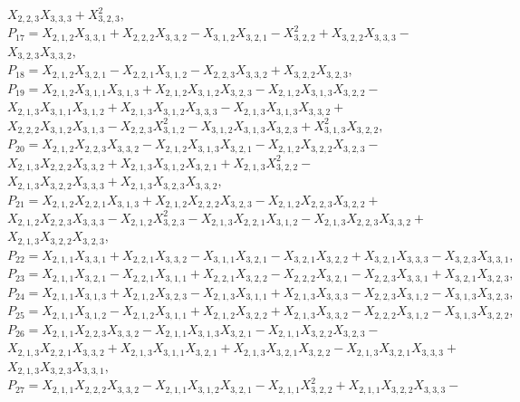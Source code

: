 \documentclass[10pt]{beamer}
\begin{document}
$X_{2,2,3}X_{3,3,3}+X_{3,2,3}^2,$\\
$P_{17}=X_{2,1,2}X_{3,3,1}+X_{2,2,2}X_{3,3,2}-X_{3,1,2}X_{3,2,1}-X_{3,2,2}^2+X_{3,2,2}X_{3,3,3}-$\\
$X_{3,2,3}X_{3,3,2},$\\
$P_{18}=X_{2,1,2}X_{3,2,1}-X_{2,2,1}X_{3,1,2}-X_{2,2,3}X_{3,3,2}+X_{3,2,2}X_{3,2,3},$\\
$P_{19}=X_{2,1,2}X_{3,1,1}X_{3,1,3}+X_{2,1,2}X_{3,1,2}X_{3,2,3}-X_{2,1,2}X_{3,1,3}X_{3,2,2}-$\\
$X_{2,1,3}X_{3,1,1}X_{3,1,2}+X_{2,1,3}X_{3,1,2}X_{3,3,3}-X_{2,1,3}X_{3,1,3}X_{3,3,2}+$\\
$X_{2,2,2}X_{3,1,2}X_{3,1,3}-X_{2,2,3}X_{3,1,2}^2-X_{3,1,2}X_{3,1,3}X_{3,2,3}+X_{3,1,3}^2X_{3,2,2},$\\
$P_{20}=X_{2,1,2}X_{2,2,3}X_{3,3,2}-X_{2,1,2}X_{3,1,3}X_{3,2,1}-X_{2,1,2}X_{3,2,2}X_{3,2,3}-$\\
$X_{2,1,3}X_{2,2,2}X_{3,3,2}+X_{2,1,3}X_{3,1,2}X_{3,2,1}+X_{2,1,3}X_{3,2,2}^2-$\\
$X_{2,1,3}X_{3,2,2}X_{3,3,3}+X_{2,1,3}X_{3,2,3}X_{3,3,2},$\\
$P_{21}=X_{2,1,2}X_{2,2,1}X_{3,1,3}+X_{2,1,2}X_{2,2,2}X_{3,2,3}-X_{2,1,2}X_{2,2,3}X_{3,2,2}+$\\
$X_{2,1,2}X_{2,2,3}X_{3,3,3}-X_{2,1,2}X_{3,2,3}^2-X_{2,1,3}X_{2,2,1}X_{3,1,2}-X_{2,1,3}X_{2,2,3}X_{3,3,2}+$\\
$X_{2,1,3}X_{3,2,2}X_{3,2,3},$\\
$P_{22}=X_{2,1,1}X_{3,3,1}+X_{2,2,1}X_{3,3,2}-X_{3,1,1}X_{3,2,1}-X_{3,2,1}X_{3,2,2}+X_{3,2,1}X_{3,3,3}-X_{3,2,3}X_{3,3,1},$\\
$P_{23}=X_{2,1,1}X_{3,2,1}-X_{2,2,1}X_{3,1,1}+X_{2,2,1}X_{3,2,2}-X_{2,2,2}X_{3,2,1}-X_{2,2,3}X_{3,3,1}+X_{3,2,1}X_{3,2,3},$\\
$P_{24}=X_{2,1,1}X_{3,1,3}+X_{2,1,2}X_{3,2,3}-X_{2,1,3}X_{3,1,1}+X_{2,1,3}X_{3,3,3}-X_{2,2,3}X_{3,1,2}-X_{3,1,3}X_{3,2,3},$\\
$P_{25}=X_{2,1,1}X_{3,1,2}-X_{2,1,2}X_{3,1,1}+X_{2,1,2}X_{3,2,2}+X_{2,1,3}X_{3,3,2}-X_{2,2,2}X_{3,1,2}-X_{3,1,3}X_{3,2,2},$\\
$P_{26}=X_{2,1,1}X_{2,2,3}X_{3,3,2}-X_{2,1,1}X_{3,1,3}X_{3,2,1}-X_{2,1,1}X_{3,2,2}X_{3,2,3}-$\\
$X_{2,1,3}X_{2,2,1}X_{3,3,2}+X_{2,1,3}X_{3,1,1}X_{3,2,1}+X_{2,1,3}X_{3,2,1}X_{3,2,2}-X_{2,1,3}X_{3,2,1}X_{3,3,3}+$\\
$X_{2,1,3}X_{3,2,3}X_{3,3,1},$\\
$P_{27}=X_{2,1,1}X_{2,2,2}X_{3,3,2}-X_{2,1,1}X_{3,1,2}X_{3,2,1}-X_{2,1,1}X_{3,2,2}^2+X_{2,1,1}X_{3,2,2}X_{3,3,3}-$\\
\end{document}
